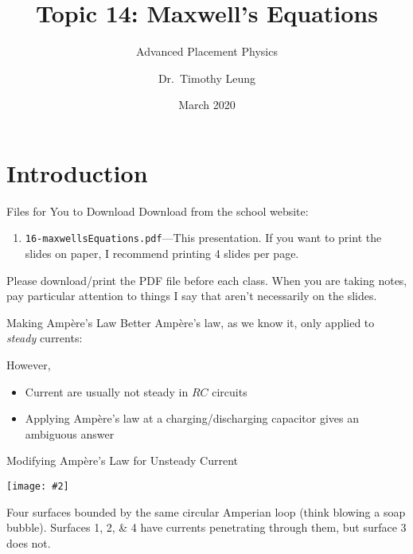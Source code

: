 \documentclass[12pt,aspectratio=169]{beamer}
\title{Topic 14: Maxwell's Equations}
\subtitle{Advanced Placement Physics}
\author{Dr.\ Timothy Leung}
\institute{Olympiads School, Toronto, ON, Canada}
\date{March 2020}
\newcommand{\pic}[2]{\texttt{[image: \#2]}}\newcommand{\mb}[1]{\mathbf{#1}}
\newcommand{\eq}[2]{\vspace{#1}{\Large\begin{displaymath}#2\end{displaymath}}}
\begin{document}
\begin{frame}
  \maketitle
\end{frame}


\section[Intro]{Introduction}

\begin{frame}{Files for You to Download}
  Download from the school website:
  \begin{enumerate}
  \item\texttt{16-maxwellsEquations.pdf}---This
    presentation. If you want to print the slides on paper, I recommend
    printing 4 slides per page.
  \end{enumerate}

  \vspace{.2in}Please download/print the PDF file before each class. When you
  are taking notes, pay particular attention to things I say that aren't
  necessarily on the slides.
\end{frame}



\begin{frame}{Making Amp\`{e}re's Law Better}
  Amp\`{e}re's law, as we know it, only applied to \emph{steady} currents:

  \eq{-.1in}{
    \oint_C \mb{B}\cdot d\boldsymbol{\ell}=\mu_0 I_c
  }
  However,
  \begin{itemize}
  \item Current are usually not steady in $RC$ circuits
  \item Applying Amp\`{e}re's law at a charging/discharging capacitor gives an
    ambiguous answer
  \end{itemize}
\end{frame}



\begin{frame}{Modifying Amp\`{e}re's Law for Unsteady Current}
  \begin{center}
    \pic{.3}{mag_displacement_fig3.png}
  \end{center}
  Four surfaces bounded by the same circular Amperian loop
  (think blowing a soap bubble). Surfaces \numlist{1;2;4} have currents
  penetrating through them, but surface \num{3} does not.
\end{frame}
\end{document}

